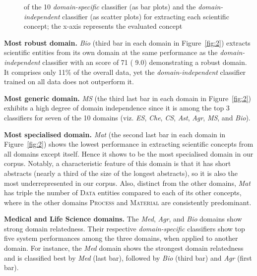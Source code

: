 \documentclass[runningheads]{llncs}
\begin{document}
\begin{figure}[htb]
    \caption{ of the 10 \textit{domain-specific} classifier (as bar plots) and the \textit{domain-independent} classifier (as scatter plots) for extracting each scientific concept; the x-axis represents the evaluated concept }
    \label{fig:3}
\end{figure}



\textbf{Most robust domain.} \textit{Bio} (third bar in each domain in Figure~\ref{fig:2}) extracts scientific entities from its own domain at the same performance as the \textit{domain-independent} classifier with an  score of 71 ( 9.0) demonstrating a robust domain. It comprises only 11\% of the overall data, yet the \textit{domain-independent} classifier trained on all data does not outperform it.

\textbf{Most generic domain.} \textit{MS} (the third last bar in each domain in Figure~\ref{fig:2}) exhibits a high degree of domain independence since it is among the top 3 classifiers for seven of the 10 domains (viz. \textit{ES}, \textit{Che}, \textit{CS}, \textit{Ast}, \textit{Agr}, \textit{MS}, and \textit{Bio}).

\textbf{Most specialised domain.} \textit{Mat} (the second last bar in each domain in Figure~\ref{fig:2}) shows the lowest performance in extracting scientific concepts from all domains except itself. Hence it shows to be the most specialised domain in our corpus. Notably, a characteristic feature of this domain is that it has short abstracts (nearly a third of the size of the longest abstracts), so it is also the most underrepresented in our corpus. Also, distinct from the other domains, \textit{Mat} has triple the number of \textsc{Data} entities compared to each of its other concepts, where in the other domains \textsc{Process} and \textsc{Material} are consistently predominant.

\textbf{Medical and Life Science domains.}
The \textit{Med}, \textit{Agr}, and \textit{Bio} domains
show strong domain relatedness. Their respective \textit{domain-specific} classifiers show top five system performances among the three domains, when applied to another domain. For instance, the \textit{Med} domain shows the strongest domain relatedness and is classified best by \textit{Med} (last bar), followed by \textit{Bio} (third bar) and \textit{Agr} (first bar).
\end{document}
